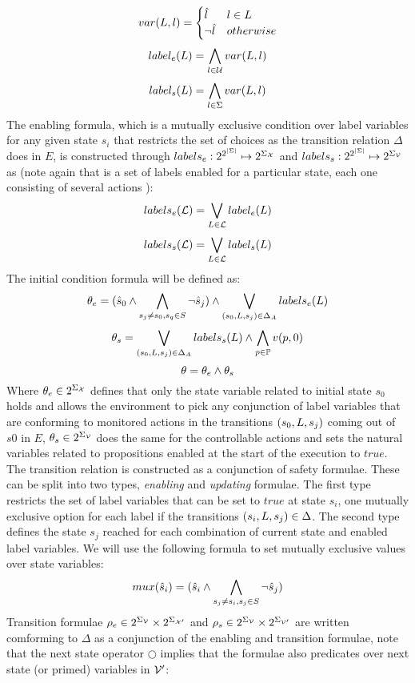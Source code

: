 \[
var(L, l) = \begin{cases}
\hat{l}_{} & l \in L \\
\neg \hat{l}_{} & otherwise
\end{cases}
\]
\[label_e(L) = \bigwedge_{l \in \mathcal{U}}var(L, l)\]
\[label_s(L) = \bigwedge_{l \in \Sigma}var(L, l)\]
The enabling formula, which is a mutually exclusive condition over label variables for any given state $s_i$ that restricts the set of choices as the transition relation $\Delta$ does in $E$, is constructed through $labels_e:2^{2^{|\Sigma|}}\mapsto 2^{\Sigma_{{\mathcal{X}}}}$ and $labels_s:2^{2^{|\Sigma|}}\mapsto 2^{\Sigma_{{\mathcal{V}}}}$ as (note again that  is a set of labels \actionLabel enabled for a particular state, each one consisting of several actions \action):
\[labels_e(\mathcal{L}) = \bigvee_{L \in \mathcal{L}}label_e(L) \]
\[labels_s(\mathcal{L}) = \bigvee_{L \in \mathcal{L}}label_s(L) \]
The initial condition formula will be defined as:
\[{\theta_e} = (\hat{s}_{0} \wedge\bigwedge_{s_j \neq s_0, s_q \in S}\neg \hat{s}_{j})  \wedge \bigvee_{(s_0,L,s_j) \in \Delta_A}labels_e(L)\]
\[{\theta_s} = \bigvee_{(s_0,L,s_j) \in \Delta_A}labels_s(L) \wedge \bigwedge_{p \in \mathbb{P}}v(p,0)\]
\[\theta = {\theta_e} \wedge {\theta_s}\]
Where ${\theta_e} \in 2^{\Sigma_{{\mathcal{X}}}}$ defines that only the state variable related to initial state $s_0$ holds and allows the environment to pick any conjunction of label variables that are conforming to monitored actions in the transitions $(s_0, L, s_j)$ coming out of $s0$ in $E$, ${\theta_s}  \in 2^{\Sigma_{{\mathcal{V}}}}$ does the same for the controllable actions and sets the natural variables related to propositions enabled at the start of the execution to $true$.
The transition relation is constructed as a conjunction of safety formulae. These can be split into two types, \emph{enabling} and \emph{updating} formulae. The first type restricts the set of label variables that can be set to $true$ at state $s_i$, one mutually exclusive option for each label \actionLabel if the transitions $(s_i,L,s_j) \in \Delta$. The second type defines the state $s_j$ reached for each combination of current state and enabled label variables. 
We will use the following formula to set mutually exclusive values over state variables:
\[mux(\hat{s}_{i}) =  (\hat{s}_{i} \wedge\bigwedge_{s_j \neq s_i, s_j \in S}\neg \hat{s}_{j})\]
Transition formulae ${\rho_e}  \in 2^{\Sigma_{{\mathcal{V}}}} \times 2^{\Sigma_{{\mathcal{X}}'}}$ and ${\rho_s}   \in 2^{\Sigma_{{\mathcal{V}}}} \times 2^{\Sigma_{{\mathcal{V}}'}}$ are written comforming to $\Delta$ as a conjunction of the enabling and transition formulae, note that the next state operator $\bigcirc$ implies that the formulae also predicates over next state (or primed) variables in ${\mathcal{V}}'$:

